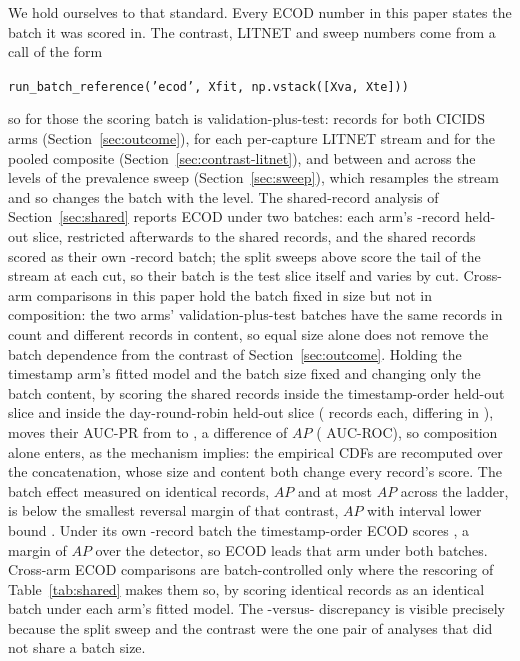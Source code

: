 \documentclass[manuscript,anonymous,review]{acmart}
\begin{document}
We hold ourselves to that standard. Every ECOD number in this paper states the
batch it was scored in. The contrast, LITNET and sweep numbers come from a call
of the form

\begin{center}
\texttt{run\_batch\_reference('ecod',\,Xfit,\,np.vstack([Xva,\,Xte]))}
\end{center}

\noindent so for those the scoring batch is validation-plus-test:
\CicidsEcodScoringBatch{} records for both CICIDS arms
(Section~\ref{sec:outcome}), \LitnetCaptureEcodScoringBatch{} for each
per-capture LITNET stream and \LitnetPooledEcodScoringBatch{} for the pooled
composite (Section~\ref{sec:contrast-litnet}), and between
\SweepEcodScoringBatchMin{} and \SweepEcodScoringBatchMax{} across the levels
of the prevalence sweep (Section~\ref{sec:sweep}), which resamples the stream
and so changes the batch with the level. The shared-record analysis of
Section~\ref{sec:shared} reports ECOD under two batches: each arm's
\CicidsHeldoutSize-record held-out slice, restricted afterwards to the
\RevSharedRecords{} shared records, and the shared records scored as their own
\RevSharedRecords-record batch; the split sweeps above score the tail of the
stream at each cut, so their batch is the test slice itself and varies by cut.
Cross-arm comparisons in this paper hold the batch fixed in size but not in
composition: the two arms' validation-plus-test batches have the same
\CicidsEcodScoringBatch{} records in count and different records in content,
so equal size alone does not remove the batch dependence from the contrast of
Section~\ref{sec:outcome}. Holding the timestamp arm's fitted model and the
batch size fixed and changing only the batch content, by scoring the
\RefEcodCompSharedRecords{} shared records inside the timestamp-order held-out
slice and inside the day-round-robin held-out slice
(\RefEcodCompBatchRecords{} records each, differing in
\RefEcodCompDifferingRecords), moves their AUC-PR from
\RefEcodCompNaturalBatchAucpr{} to \RefEcodCompSyntheticBatchAucpr, a
difference of \RefEcodCompDeltaAucpr{} $AP$ (\RefEcodCompDeltaAucroc{}
AUC-ROC), so composition alone enters, as the mechanism implies: the empirical
CDFs are recomputed over the concatenation, whose size and content both change
every record's score. The batch effect measured on identical records,
\RevEcodBatchDelta{} $AP$ and at most \RevEcodBatchSpread{} $AP$ across the
ladder, is below the smallest reversal margin of that contrast,
\SFourCicidsNaturalEcodMinusDetectorAucpr{} $AP$ with interval lower bound
\RefBootFullNaturalMarginLo. Under its own \RevEcodBatchEvalRecords-record
batch the timestamp-order ECOD scores \RevEcodBatchTwoFourZeroZeroZeroZeroAucpr,
a margin of \SFourCicidsNaturalEcodOwnBatchMinusDetectorAucpr{} $AP$ over the
detector, so ECOD leads that arm under both batches. Cross-arm ECOD
comparisons are batch-controlled
only where the rescoring of Table~\ref{tab:shared} makes them so, by scoring
identical records as an identical batch under each arm's fitted model. The
\CicidsHeldoutSize-versus-\CicidsEcodScoringBatch{} discrepancy is visible
precisely because the split sweep and the contrast were the one pair of
analyses that did not share a batch size.
\end{document}
